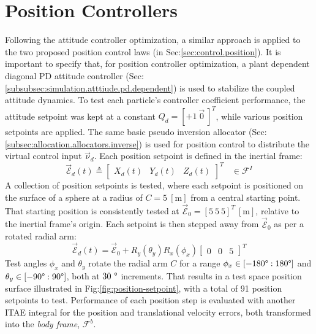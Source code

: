 \section{Position Controllers}
\label{sec:simulation.position}
Following the attitude controller optimization, a similar approach is applied to the two proposed position control laws (in Sec:\ref{sec:control.position}). It is important to specify that, for position controller optimization, a plant dependent diagonal PD attitude controller (Sec:\ref{subsubsec:simulation.atttiude.pd.dependent}) is used to stabilize the coupled attitude dynamics. To test each particle's controller coefficient performance, the attitude setpoint was kept at a constant $Q_d=[+1~\vec{0}\hspace{2pt}]^T$, while various position setpoints are applied. The same basic pseudo inversion allocator (Sec:\ref{subsec:allocation.allocators.inverse}) is used for position control to distribute the virtual control input $\vec{\nu}_d$. Each position setpoint is defined in the inertial frame:
\begin{equation}
\vec{\mathcal{E}}_d(t)\triangleq\begin{bmatrix}
X_d(t)&
Y_d(t)&
Z_d(t)
\end{bmatrix}^T
~~~~\in\mathcal{F}^{I}
\end{equation}
A collection of position setpoints is tested, where each setpoint is positioned on the surface of a sphere at a radius of $C=5~[\text{m}]$ from a central starting point. That starting position is consistently tested at $\vec{\mathcal{E}}_0=[5~5~5]^{T}~[\text{m}]$, relative to the inertial frame's origin. Each setpoint is then stepped away from $\vec{\mathcal{E}}_0$ as per a rotated radial arm:
\begin{equation}
\vec{\mathcal{E}}_d(t)=\vec{\mathcal{E}}_0+R_y(\theta_{y})R_x(\phi_{x})\begin{bmatrix}
0 & 0 & 5
\end{bmatrix}^T
\end{equation}
Test angles $\phi_x$ and $\theta_y$ rotate the radial arm  $C$ for a range $\phi_x\in[-180\text{\textdegree}:180\text{\textdegree}]$ and $\theta_y\in[-90\text{\textdegree}:90\text{\textdegree}]$, both at $30~\text{\textdegree}$ increments. That results in a test space position surface illustrated in Fig:\ref{fig:position-setpoint}, with a total of 91 position setpoints to test. Performance of each position step is evaluated with another ITAE integral for the position and translational velocity errors, both transformed into the \emph{body frame}, $\mathcal{F}^{b}$. 
